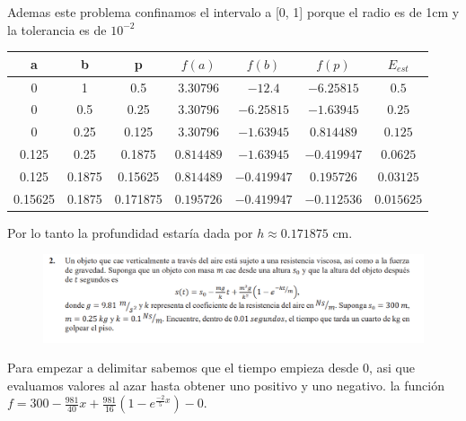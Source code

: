 \documentclass[12pt]{article}
\begin{document}
Ademas este problema confinamos el intervalo a [0, 1] porque el radio es de 1cm y la tolerancia es de $10^{-2}$


\begin{center}
    \begin{tabular}{|c|c|c|c|c|c|c|}
        \hline
        a & b&p&$f(a)$&$f(b)$&$f(p)$&$E_{est}$\\
        \hline
        0& 1   &  0.5    & $3.30796$ & $-12.4$    & $-6.25815$& $0.5$\\
        0& 0.5 &  0.25   & $3.30796$ & $-6.25815$ & $-1.63945$& $0.25$\\
        0& 0.25&  0.125  & $3.30796$ & $-1.63945$ & $0.814489$& $0.125$\\
    0.125& 0.25&  0.1875  & $0.814489$& $-1.63945$& $-0.419947$& $0.0625$\\
    0.125& 0.1875&  0.15625 & $0.814489$& $-0.419947$& $0.195726$& $0.03125$\\
  0.15625& 0.1875& 0.171875 & $0.195726$& $-0.419947$& $-0.112536$& $0.015625$\\
        \hline
      \end{tabular} 
\end{center}

Por lo tanto la profundidad estaría dada por $h \approx 0.171875$ cm.


\begin{figure}[H]
    \centering
    \includegraphics[width=1\textwidth]{./inFiles/Figures/Cap2.png}
\end{figure}


Para empezar a delimitar sabemos que el tiempo empieza desde 0, asi que evaluamos valores al azar hasta obtener uno positivo y uno negativo.
la función $f = 300-\frac{981}{40}x+\frac{981}{16}(1-e^{\frac{-2}{5}x})-0$.
\end{document}
